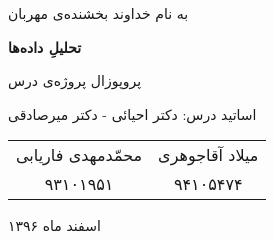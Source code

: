 \pagecolor{my_grey}
\color{white}
\begin{center}
\large
به نام خداوند بخشنده‌ی مهربان

\Huge
\vspace*{3cm}
\fontsize{40}{12}\selectfont
\textbf{تحلیل‌ِ داده‌ها}

\vspace*{1cm}
\large
پروپوزال پروژه‌ی درس
\vspace*{2cm}

\Large
اساتید درس: دکتر احیائی - دکتر میرصادقی
\vspace*{2cm}

\vspace*{1cm}

\begin{tabular}{cc}
 محمّدمهدی فاریابی
	& 
میلاد آقاجوهری
	\\
۹۳۱۰۱۹۵۱
	&
۹۴۱۰۵۴۷۴
	 \\
\end{tabular}

 

\vspace*{3cm} 
\large

اسفند ماه ۱۳۹۶
\vspace*{6cm}

\end{center}
\newpage
\pagecolor{white}
\color{black}